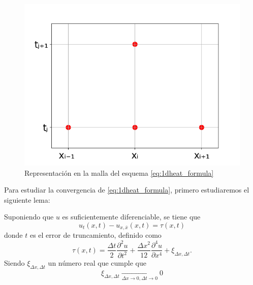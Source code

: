 \begin{figure}[h]
	\centering
	\includegraphics[scale=0.5]{./Imagenes/Bitmap/1dheat.png}
	\caption{Representación en la malla del esquema \ref{eq:1dheat_formula}}
\end{figure}

Para estudiar la convergencia de \ref{eq:1dheat_formula}, primero estudiaremos el siguiente lema:

\begin{lema}
	Suponiendo que $u$ es suficientemente diferenciable, se tiene que
	\begin{equation}
		\label{eq:lema1_eq1}
		u_t(x,t)-u_{x,\bar{x}}(x,t) = \tau(x,t)
	\end{equation}
	donde $t$ es el error de truncamiento, definido como
	\begin{equation}
		\label{eq:lema1_eq2}
		\tau(x,t) = \frac{\Delta t}{2}\frac{\partial^2 u}{\partial t^2} + \frac{\Delta x^2}{12}\frac{\partial^4u}{\partial x^4} + \xi_{\Delta x, \Delta t}.
	\end{equation}
	Siendo $\xi_{\Delta x, \Delta t}$ un número real que cumple que
	\begin{equation*}
		\xi_{\Delta x, \Delta t} \xrightarrow[\Delta x \rightarrow 0, \Delta t\rightarrow 0]{} 0 
	\end{equation*}
	
\end{lema}

